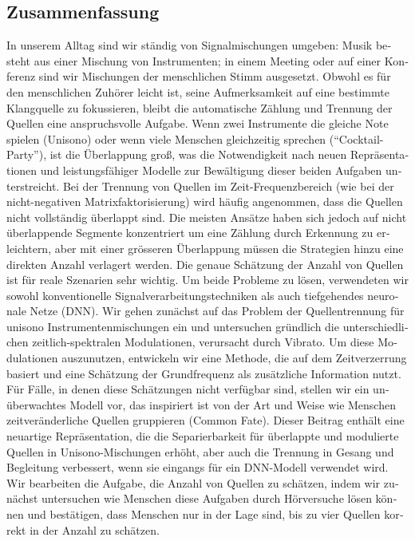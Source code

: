 \vfill

\begin{otherlanguage}{ngerman}
\chapter*{Zusammenfassung}

In unserem Alltag sind wir ständig von Signalmischungen umgeben: Musik  besteht aus einer Mischung von Instrumenten; in einem Meeting oder auf einer Konferenz sind wir Mischungen der menschlichen Stimm ausgesetzt.
Obwohl es für den menschlichen Zuhörer leicht ist, seine Aufmerksamkeit auf eine bestimmte Klangquelle zu fokussieren, bleibt die automatische Zählung und Trennung der Quellen eine anspruchsvolle Aufgabe.
Wenn zwei Instrumente die gleiche Note spielen (Unisono) oder wenn viele Menschen gleichzeitig sprechen (``Cocktail-Party''), ist die Überlappung groß, was die Notwendigkeit nach neuen Repräsentationen und leistungsfähiger Modelle zur Bewältigung dieser beiden Aufgaben unterstreicht.
Bei der Trennung von Quellen im Zeit-Frequenzbereich (wie bei der nicht-negativen Matrixfaktorisierung) wird häufig angenommen, dass die Quellen nicht vollständig überlappt sind.
Die meisten Ansätze haben sich jedoch auf nicht überlappende Segmente konzentriert um eine Zählung durch Erkennung zu erleichtern, aber mit einer grösseren Überlappung müssen die Strategien hinzu eine direkten  Anzahl verlagert werden.
Die genaue Schätzung der Anzahl von Quellen ist für reale Szenarien sehr wichtig.
Um beide Probleme zu lösen, verwendeten wir sowohl konventionelle Signalverarbeitungstechniken als auch tiefgehendes neuronale Netze (DNN).
Wir gehen zunächst auf das Problem der Quellentrennung für unisono Instrumentenmischungen ein und untersuchen gründlich die unterschiedlichen zeitlich-spektralen Modulationen, verursacht durch Vibrato. 
Um diese Modulationen auszunutzen, entwickeln wir eine Methode, die auf dem Zeitverzerrung basiert und eine Schätzung der Grundfrequenz als zusätzliche Information nutzt.
Für Fälle, in denen diese Schätzungen nicht verfügbar sind, stellen wir ein unüberwachtes Modell vor, das inspiriert ist von der Art und Weise  wie Menschen zeitveränderliche Quellen gruppieren (Common Fate).
Dieser Beitrag enthält eine neuartige Repräsentation, die die Separierbarkeit für überlappte und modulierte Quellen in  Unisono-Mischungen erhöht, aber auch die Trennung in Gesang und Begleitung verbessert, wenn sie eingangs für ein DNN-Modell verwendet wird.
Wir bearbeiten die Aufgabe, die Anzahl von Quellen zu schätzen, indem wir zunächst untersuchen wie Menschen diese Aufgaben durch Hörversuche lösen können und bestätigen, dass Menschen nur in der Lage sind, bis zu vier Quellen korrekt in der Anzahl zu schätzen.

\end{otherlanguage}

